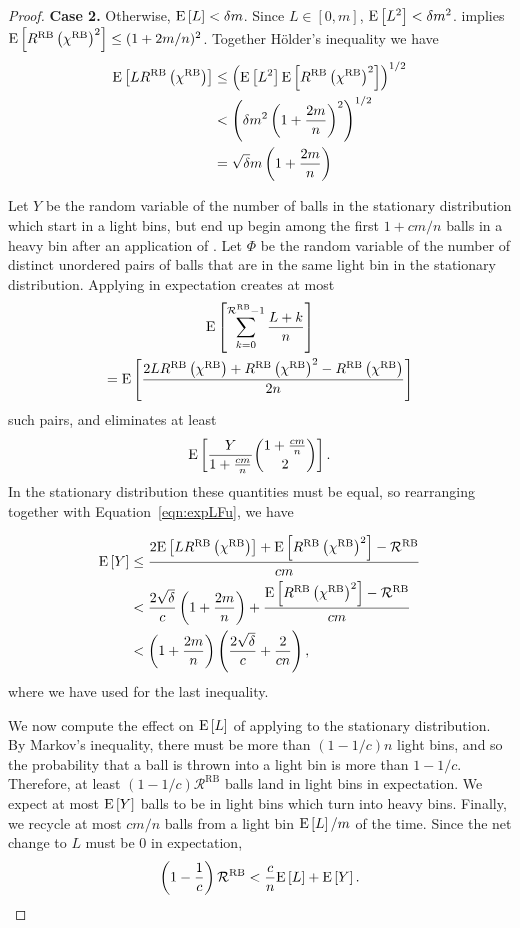 \begin{proof}
\medskip 

{\bf Case 2.} Otherwise, $\mathrm{E}\left[L\right] < \delta m$. Since $L \in [0, m]$, $\mathrm{E}\left[L^2\right] <
	\delta m^2$.  implies $\mathrm{E}\left[R^\textrm{RB}\left(\chi^\textrm{RB}\right)^2\right] \le (1+2m/n)^2$. Together H\"{o}lder's inequality we have
\begin{align}
	\mathrm{E}\left[LR^\textrm{RB}\left(\chi^\textrm{RB}\right)\right]
	&\le \left(\mathrm{E}\left[L^2\right]\mathrm{E}\left[R^\textrm{RB}\left(\chi^\textrm{RB}\right)^2\right]\right)^{1/2} \nonumber \\
	&< \left(\delta m^2 \left(1+\frac{2m}{n}\right)^2\right)^{1/2} \nonumber\\
	&= \sqrt{\delta} m\left(1 + \frac{2m}{n}\right) \label{eqn:expLFu}
\end{align}

	Let $Y$ be the random variable of the number of balls in the stationary
	distribution which start in a light bins, but end up begin among the first
	$1 + cm/n$ balls in a heavy bin after an application of \RB.  Let $\Phi$
	be the random variable of the number of distinct unordered pairs of balls
	that are in the same light bin in the stationary distribution. Applying \RB
	in expectation creates at most
	\begin{multline*}
          \mathrm{E}\left[\sum_{k=0}^{\mathcal{R}^\textrm{RB}-1}\frac{L + k}{n}\right] \\
		  = \mathrm{E}\left[\frac{2LR^\textrm{RB}\left(\chi^\textrm{RB}\right) + R^\textrm{RB}\left(\chi^\textrm{RB}\right)^2 - R^\textrm{RB}\left(\chi^\textrm{RB}\right)}{2n}\right]
	\end{multline*}
	such pairs, and eliminates at least
	\[ \mathrm{E}\left[\frac{Y}{1+\frac{cm}{n}}\binom{1+\frac{cm}{n}}{2}\right].\]
	In the stationary distribution these quantities must be equal, so
	rearranging together with Equation~\eqref{eqn:expLFu}, we have
	
\begin{align*}
	\mathrm{E}\left[Y\right] 
	&\le \frac{2\mathrm{E}\left[LR^\textrm{RB}\left(\chi^\textrm{RB}\right)\right] + \mathrm{E}\left[R^\textrm{RB}\left(\chi^\textrm{RB}\right)^2\right] - \mathcal{R}^\textrm{RB}}{cm} \nonumber \\
	&< \frac{2\sqrt{\delta}}{c}\left(1+\frac{2m}{n}\right) + \frac{\mathrm{E}\left[R^\textrm{RB}\left(\chi^\textrm{RB}\right)^2\right] - \mathcal{R}^\textrm{RB}}{cm} \\
	&<\left(1+\frac{2m}{n}\right)\left(\frac{2\sqrt{\delta}}{c}+\frac{2}{cn}\right),  
\end{align*}
where we have used  for the last inequality.

We now compute the effect on $\mathrm{E}\left[L\right]$ of applying \RB to the stationary
distribution.  By Markov's inequality, there must be more than $(1-1/c)n$ light
bins, and so the probability that a ball is thrown into a light bin is more
than $1-1/c$. Therefore, at least $(1-1/c)\mathcal{R}^\textrm{RB}$ balls land
in light bins in expectation. We expect at most $\mathrm{E}\left[Y\right]$ balls to be in light
bins which turn into heavy bins. Finally, we recycle at most $cm/n$ balls from
a light bin $\mathrm{E}\left[L\right]/m$ of the time. Since the net change to $L$ must be $0$ in
expectation,
\[\left(1-\frac{1}{c}\right)\mathcal{R}^\textrm{RB} < \frac{c}{n}\mathrm{E}\left[L\right] + \mathrm{E}\left[Y\right].\]


\end{proof}

